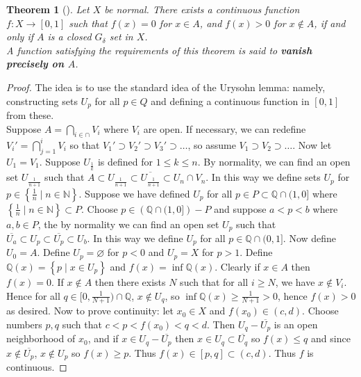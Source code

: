 \documentclass[reqno]{amsart}
\theoremstyle{plain}%
\newtheorem{theorem}{Theorem}[section]
\theoremstyle{definition}
\theoremstyle{remark}
\begin{document}
\begin{theorem}[]
    Let $X$ be normal. There exists a continuous function
    $f  \colon X \to \left[ 0,1 \right] $ such that
    $f(x) = 0$ for $x \in A$, and $f(x) >0$ for
    $x \not\in A$, if and only if $A$ is a closed
    $G_{\delta}$ set in $X$.\\
    A function satisfying the requirements of this theorem is
    said to \textbf{vanish precisely on $A$}.
\end{theorem}

\begin{proof}
    The idea is to use the standard idea of the Urysohn lemma:
    namely, constructing sets $U_p$ for all $p \in Q$ and
    defining a continuous function in $\left[ 0,1 \right] $ from these.\\
    Suppose $A = \bigcap_{i \in \cap } V_i$ where
    $V_i$ are open. If necessary, we can redefine
    $V_i' = \bigcap_{j=1}^{i} V_i$ so that
    $V_1' \supset V_2' \supset V_3' \supset \ldots$, so assume
    $V_1 \supset V_2 \supset \ldots$.
    Now let $U_1 = V_1$. Suppose $U_{\frac{1}{k}}$ is defined for
    $1 \le k \le  n$. By normality, we can find an open set
    $U_{\frac{1}{n+1}}$ such that
    $A \subset U_{\frac{1}{n+1}} \subset \overline{U_{\frac{1}{n+1}}}
    \subset U_{n} \cap V_n$.
    In this way we define sets $U_p$ for $p \in \left\{ \frac{1}{n}  \mid 
    n \in \mathbb{N} \right\} $. Suppose we have defined
$U_p$ for all $p \in P \subset \mathbb{Q} \cap (1, 0]$ where
$\left\{ \frac{1}{n} \mid n \in \mathbb{N} \right\} \subset P$. Choose
$p \in \left( \mathbb{Q} \cap (1,0] \right) - P$ and suppose
$a < p < b$ where $a,b \in P$, the by normality we can find an open set $U_p$
such that
$\overline{U_a} \subset U_p \subset \overline{U_p} \subset U_b$. In this way we
define $U_p$ for all $p \in \mathbb{Q} \cap (0,1]$. Now define
$U_0 = A$. Define 
$U_p = \varnothing$ for $p < 0$ and $U_p = X$ for $p > 1$. Define
$\mathbb{Q} (x) = \left\{ p  \mid x \in U_p \right\}  $ and
$f (x) = \inf \mathbb{Q}(x)$. Clearly if $x \in A$ then
$f(x) = 0$. If $x \not\in  A$ then there exists $N$ such that for all
$i \ge N$, we have $x \not\in V_i$. Hence for all $q \in [0, \frac{1}{N+1}) \cap
\mathbb{Q}$,
$x \not\in  U_{q}$, so $\inf \mathbb{Q}(x) \ge \frac{1}{N+1} > 0$, hence
$f(x) > 0$ as desired. Now to prove continuity: let $x_0 \in X$ and
$f(x_0) \in  (c,d)$. Choose numbers $p,q$ such that
$c < p < f(x_0) < q < d$. Then $U_q - \overline{U_p}$ is an open neighborhood
of $x_0$, and if $x \in U_q - \overline{U_p}$ then
$x \in U_q \subset \overline{U_q}$ so $f(x) \le q$ and since
$x \not\in  \overline{U_p}$, $x \not\in  U_p$ so $f(x) \ge p$. Thus
$f(x) \in \left[ p,q \right] \subset (c,d)$. Thus $f$ is continuous.
\end{proof}
\end{document}
